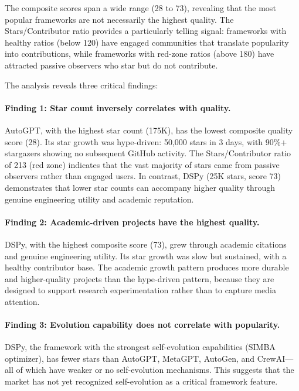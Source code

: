 The composite scores span a wide range (28 to 73), revealing that the most popular frameworks are not necessarily the highest quality. The Stars/Contributor ratio provides a particularly telling signal: frameworks with healthy ratios (below 120) have engaged communities that translate popularity into contributions, while frameworks with red-zone ratios (above 180) have attracted passive observers who star but do not contribute.

The analysis reveals three critical findings:

\paragraph{Finding 1: Star count inversely correlates with quality.}
AutoGPT, with the highest star count (175K), has the lowest composite quality score (28). Its star growth was hype-driven: 50,000 stars in 3 days, with 90\%+ stargazers showing no subsequent GitHub activity. The Stars/Contributor ratio of 213 (red zone) indicates that the vast majority of stars came from passive observers rather than engaged users. In contrast, DSPy (25K stars, score 73) demonstrates that lower star counts can accompany higher quality through genuine engineering utility and academic reputation.

\paragraph{Finding 2: Academic-driven projects have the highest quality.}
DSPy, with the highest composite score (73), grew through academic citations and genuine engineering utility. Its star growth was slow but sustained, with a healthy contributor base. The academic growth pattern produces more durable and higher-quality projects than the hype-driven pattern, because they are designed to support research experimentation rather than to capture media attention.

\paragraph{Finding 3: Evolution capability does not correlate with popularity.}
DSPy, the framework with the strongest self-evolution capabilities (SIMBA optimizer), has fewer stars than AutoGPT, MetaGPT, AutoGen, and CrewAI---all of which have weaker or no self-evolution mechanisms. This suggests that the market has not yet recognized self-evolution as a critical framework feature.

